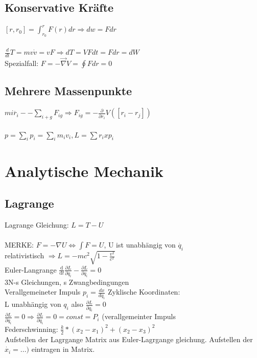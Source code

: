 \documentclass[10pt,a4paper]{article}
\begin{document}
\subsection{Konservative Kräfte}
$[r,r_0]=\int_{r_0}^r F(r) dr \Rightarrow dw = Fdr$\\
%
\\
$\frac{d}{dt}T=mv\dot{v}=vF \Rightarrow dT = VFdt = Fdr = dW$\\
Spezialfall: $F=-\vec{\nabla}V=\oint Fdr=0$\\

\subsection{Mehrere Massenpunkte}
$mi \ddot{r_i} -- \sum_{i+g} F_{ig} \Rightarrow F_{ig} = - \frac{\partial}{\partial r_i} V([r_i-r_j])$\\
%
\\
$p=\sum_i p_i = \sum_i m_i v_i, L = \sum r_i x p_i$\\







\section{Analytische Mechanik}
\subsection{Lagrange}
Lagrange Gleichung: $L = T - U$\\
%
\\
MERKE: $F = -\nabla U \Leftrightarrow \int F = U$, U ist unabhängig von $\dot{q_i}$\\
relativistisch $\Rightarrow L = -mc^2\sqrt{1-\frac{v^2}{c^2}}$
%
\\
Euler-Langrange $\frac{\text{d}}{\text{d}t} \frac{\partial L}{\partial \dot{q}_i} - \frac{\partial{L}}{\partial q_i} = 0$\\
3N-s Gleichungen, s Zwangbedingungen
%
\\
Verallgemeineter Impuls
$p_i = \frac{d x}{d q_i}$
%
Zyklische Koordinaten:\\
L unabhängig von $q_i$ also $ \frac{\partial L}{\partial q_i}=0$\\
$\frac{\partial{L}}{\partial q_i}=0 \Rightarrow \frac{\partial L}{\partial q_i}=0=const=P_i$ (verallgemeinter Impuls\\
%
Federschwinning: $\frac{k}{2}*(x_2-x_1)^2+(x_2-x_3)^2$\\
%
Aufstellen der Lagrgange Matrix aus Euler-Lagrgange gleichung. Aufstellen der $\dot{x_i}=...)$  eintragen in Matrix.
\end{document}

